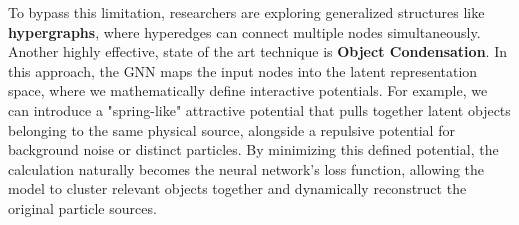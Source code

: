 To bypass this limitation, researchers are exploring generalized structures like \textbf{hypergraphs}, where hyperedges can connect multiple nodes simultaneously. Another highly effective, state of the art technique is \textbf{Object Condensation}. In this approach, the GNN maps the input nodes into the latent representation space, where we mathematically define interactive potentials. For example, we can introduce a "spring-like" attractive potential that pulls together latent objects belonging to the same physical source, alongside a repulsive potential for background noise or distinct particles. By minimizing this defined potential, the calculation naturally becomes the neural network's loss function, allowing the model to cluster relevant objects together and dynamically reconstruct the original particle sources.

